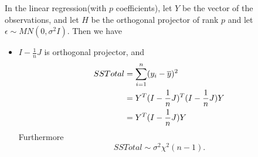 \begin{refsection}
\begin{theorem}\label{ch:theory-of-statistics:th:variancedecompositionlinearregression}\cite[76]{montgomery2012introduction}
	In the linear regression(with $p$ coefficients), let $Y$ be the vector of the observations, and let $H$ be the orthogonal projector of rank $p$ and let $\epsilon \sim MN(0,\sigma^2 I)$. Then we have
	\begin{itemize}
		\item $I-\frac{1}{n}J$ is orthogonal projector, and 
		\begin{align*}
		SSTotal &= \sum_{i=1}^{n} (y_i - \overline{y})^2 \\
		&= Y^T(I-\frac{1}{n}J)^T(I-\frac{1}{n}J)Y\\
		&=Y^T(I-\frac{1}{n}J)Y
		\end{align*}
	Furthermore
	$$SSTotal \sim \sigma^2 \chi^2(n-1).$$	
		

\end{itemize}
\end{theorem}
\end{refsection}
